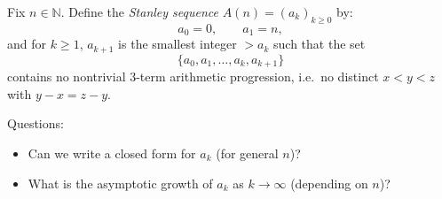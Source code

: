 Fix $n\in\mathbb{N}$.  Define the \emph{Stanley sequence} $A(n)=(a_k)_{k\ge 0}$ by:
\[
a_0=0,\qquad a_1=n,
\]
and for $k\ge 1$, $a_{k+1}$ is the smallest integer $>a_k$ such that the set
\[
\{a_0,a_1,\dots,a_k,a_{k+1}\}
\]
contains no nontrivial 3-term arithmetic progression, i.e.\ no distinct $x<y<z$ with $y-x=z-y$.

Questions:
\begin{itemize}[itemsep=2pt]
\item Can we write a closed form for $a_k$ (for general $n$)?
\item What is the asymptotic growth of $a_k$ as $k\to\infty$ (depending on $n$)?
\end{itemize}
